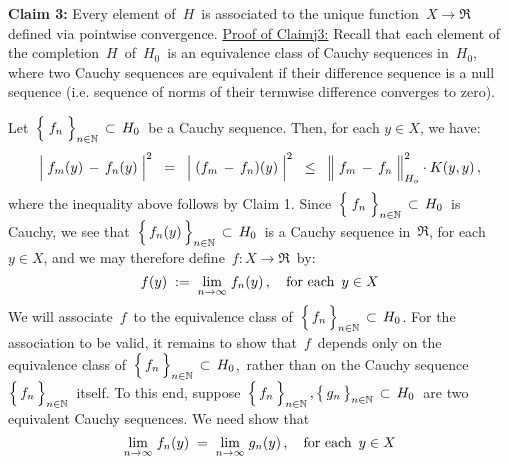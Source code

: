 \vskip 0.8cm
\noindent
\textbf{Claim 3:}\quad
Every element of \,$H$\, is associated to the unique function
\,$X \longrightarrow \Re$\, defined via pointwise convergence.
\vskip 0.2cm
\noindent
\underline{Proof of Claim{\color{white}j}3:}
\vskip0.2cm
\noindent
Recall that each element of the completion \,$H$\, of \,$H_{0}$\,
is an equivalence class of Cauchy sequences in \,$H_{0}$,\,
where two Cauchy sequences are equivalent if their difference
sequence is a null sequence
(i.e. sequence of norms of their termwise difference converges to zero).

Let \,$\left\{\;\overset{{\color{white}.}}{f_{n}}\;\right\}_{n\in\N} \,\subset\, H_{0}$\,
be a Cauchy sequence. Then, for each $y \in X$, we have:
\begin{equation*}
\left\vert\; f_{m}(y) \,\overset{{\color{white}.}}{-}\, f_{n}(y) \;\right\vert^{2}
\;\; = \;\;
	\left\vert\; (f_{m} \,\overset{{\color{white}.}}{-}\, f_{n})(y) \;\right\vert^{2}
\;\; \leq \;\;
	\left\Vert\; f_{m} \,\overset{{\color{white}.}}{-}\, f_{n} \;\right\Vert_{H_{o}}^{2}
	\cdot
	K(y,y)\,,
\end{equation*}
where the inequality above follows by Claim 1.
Since
\,$\left\{\;\overset{{\color{white}.}}{f_{n}}\;\right\}_{n\in\N} \,\subset\, H_{0}$\,
is Cauchy, we see that
\,$\left\{\,\overset{{\color{white}.}}{f_{n}}(y)\,\right\}_{n\in\N} \,\subset\, H_{0}$\,
is a Cauchy sequence in \,$\Re$, for each \,$y \in X$, and we may therefore define
\,$f : X \longrightarrow \Re$\, by:
\begin{equation*}
f(y) \; := \; \underset{n\rightarrow\infty}{\lim}\;f_{n}(y)\,,
\quad
\textnormal{for each \,$y \in X$}
\end{equation*}
We will associate \,$f$\, to the equivalence class of
\,$\left\{\,\overset{{\color{white}.}}{f_{n}}\,\right\}_{n\in\N} \,\subset\, H_{0}$.
For the association to be valid, it remains to show that
\,$f$\, depends only on the equivalence class of 
\,$\left\{\,\overset{{\color{white}.}}{f_{n}}\,\right\}_{n\in\N} \,\subset\, H_{0}$,\,
rather than on the Cauchy sequence
\,$\left\{\,\overset{{\color{white}.}}{f_{n}}\,\right\}_{n\in\N}$\,
itself.
To this end, suppose
\,$\left\{\,\overset{{\color{white}.}}{f_{n}}\,\right\}_{n\in\N}, \left\{\,\overset{{\color{white}.}}{g_{n}}\,\right\}_{n\in\N} \,\subset\, H_{0}$\,
are two equivalent Cauchy sequences.
We need show that
\begin{equation*}
\underset{n\rightarrow\infty}{\lim}\;f_{n}(y)
\; = \; 
\underset{n\rightarrow\infty}{\lim}\;g_{n}(y)\,,
\quad
\textnormal{for each \,$y \in X$}
\end{equation*}

